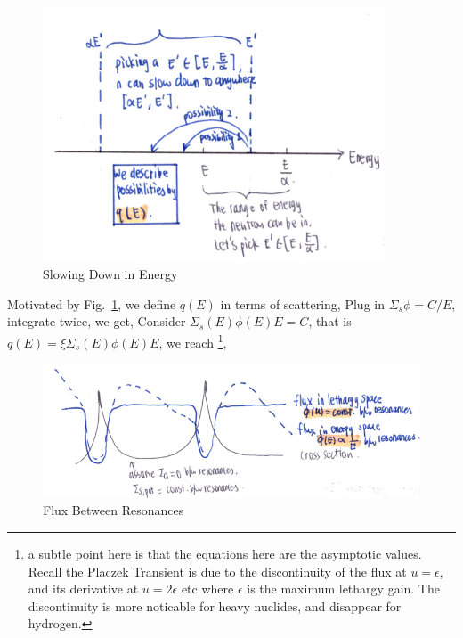 \documentclass{school-22.211-notes}
\begin{document}
\begin{enumerate}
      \begin{figure}[ht]
        \centering
        \includegraphics[width=4in]{images/sl-d/sl-d-energy.png}
        \caption{Slowing Down in Energy} \label{sl-d-energy}
      \end{figure}

      Motivated by Fig.~\ref{sl-d-energy}, we define $q(E)$ in terms of scattering, 
      Plug in $\Sigma_s \phi = C/E$, integrate twice, we get, 
      Consider $\Sigma_s (E) \phi(E) E = C$, that is $q(E) = \xi \Sigma_s (E) \phi(E) E$, we reach \footnote{a subtle point here is that the equations here are the asymptotic values. Recall the Placzek Transient is due to the discontinuity of the flux at $u = \epsilon$, and its derivative at $u = 2 \epsilon$ etc where $\epsilon$ is the maximum lethargy gain. The discontinuity is more noticable for heavy nuclides, and disappear for hydrogen.}, 

      \begin{figure}[ht]
        \centering
        \includegraphics[width=6.5in]{images/sl-d/resonance-flux.png}
        \caption{Flux Between Resonances} \label{resonance-flux}
      \end{figure}
\end{enumerate}
\end{document}
